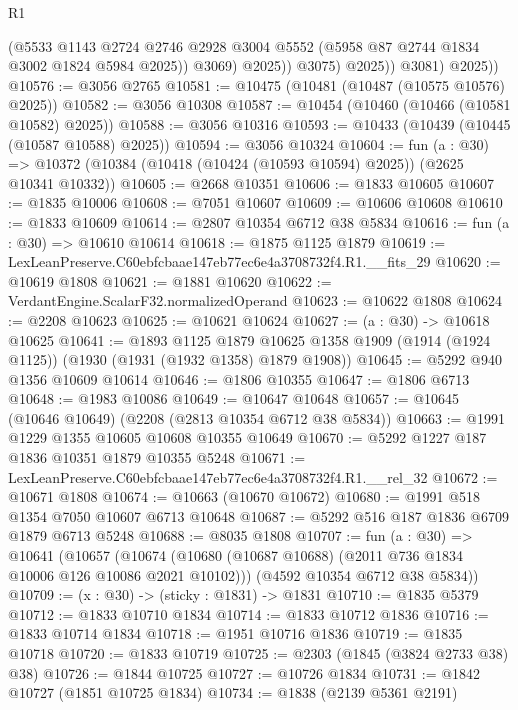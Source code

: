 \begin{lexlean}{R1}
\begin{coremodule}
                      (@5533
                        @1143
                        @2724
                        @2746
                        @2928
                        @3004
                        @5552
                        (@5958 @87 @2744 @1834 @3002 @1824 @5984 @2025))
                      @3069)
                    @2025))
                @3075)
              @2025))
          @3081)
        @2025))
@10576 := @3056 @2765
@10581 := @10475 (@10481 (@10487 (@10575 @10576) @2025))
@10582 := @3056 @10308
@10587 := @10454 (@10460 (@10466 (@10581 @10582) @2025))
@10588 := @3056 @10316
@10593 := @10433 (@10439 (@10445 (@10587 @10588) @2025))
@10594 := @3056 @10324
@10604 := fun (a : @30) =>
  @10372 (@10384 (@10418 (@10424 (@10593 @10594) @2025)) (@2625 @10341 @10332))
@10605 := @2668 @10351
@10606 := @1833 @10605
@10607 := @1835 @10006
@10608 := @7051 @10607
@10609 := @10606 @10608
@10610 := @1833 @10609
@10614 := @2807 @10354 @6712 @38 @5834
@10616 := fun (a : @30) => @10610 @10614
@10618 := @1875 @1125 @1879
@10619 := LexLeanPreserve.C60ebfcbaae147eb77ec6e4a3708732f4.R1.__fits_29
@10620 := @10619 @1808
@10621 := @1881 @10620
@10622 := VerdantEngine.ScalarF32.normalizedOperand
@10623 := @10622 @1808
@10624 := @2208 @10623
@10625 := @10621 @10624
@10627 := (a : @30) -> @10618 @10625
@10641 := @1893
    @1125
    @1879
    @10625
    @1358
    @1909
    (@1914 (@1924 @1125))
    (@1930 (@1931 (@1932 @1358) @1879 @1908))
@10645 := @5292 @940 @1356 @10609 @10614
@10646 := @1806 @10355
@10647 := @1806 @6713
@10648 := @1983 @10086
@10649 := @10647 @10648
@10657 := @10645 (@10646 @10649) (@2208 (@2813 @10354 @6712 @38 @5834))
@10663 := @1991 @1229 @1355 @10605 @10608 @10355 @10649
@10670 := @5292 @1227 @187 @1836 @10351 @1879 @10355 @5248
@10671 := LexLeanPreserve.C60ebfcbaae147eb77ec6e4a3708732f4.R1.__rel_32
@10672 := @10671 @1808
@10674 := @10663 (@10670 @10672)
@10680 := @1991 @518 @1354 @7050 @10607 @6713 @10648
@10687 := @5292 @516 @187 @1836 @6709 @1879 @6713 @5248
@10688 := @8035 @1808
@10707 := fun (a : @30) =>
  @10641
    (@10657
      (@10674 (@10680 (@10687 @10688) (@2011 @736 @1834 @10006 @126 @10086 @2021 @10102)))
      (@4592 @10354 @6712 @38 @5834))
@10709 := (x : @30) -> (sticky : @1831) -> @1831
@10710 := @1835 @5379
@10712 := @1833 @10710 @1834
@10714 := @1833 @10712 @1836
@10716 := @1833 @10714 @1834
@10718 := @1951 @10716 @1836
@10719 := @1835 @10718
@10720 := @1833 @10719
@10725 := @2303 (@1845 (@3824 @2733 @38) @38)
@10726 := @1844 @10725
@10727 := @10726 @1834
@10731 := @1842 @10727 (@1851 @10725 @1834)
@10734 := @1838 (@2139 @5361 @2191)

\end{coremodule}
\end{lexlean}

